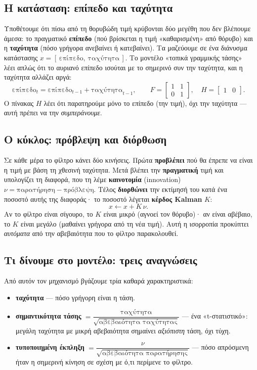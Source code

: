 \documentclass[11pt]{article}
\begin{document}
\subsection{Η κατάσταση: επίπεδο και ταχύτητα}
Υποθέτουμε ότι πίσω από τη θορυβώδη τιμή κρύβονται δύο μεγέθη που δεν βλέπουμε άμεσα: το πραγματικό
\textbf{επίπεδο} (πού βρίσκεται η τιμή «καθαρισμένη» από θόρυβο) και η \textbf{ταχύτητα} (πόσο γρήγορα
ανεβαίνει ή κατεβαίνει). Τα μαζεύουμε σε ένα διάνυσμα κατάστασης $x=[\,\text{επίπεδο},\ \text{ταχύτητα}\,]$.
Το μοντέλο «τοπικά γραμμικής τάσης» λέει απλώς ότι το αυριανό επίπεδο ισούται με το σημερινό συν την
ταχύτητα, και η ταχύτητα αλλάζει αργά:
\[
\text{επίπεδο}_{t} = \text{επίπεδο}_{t-1} + \text{ταχύτητα}_{t-1}, \qquad
F=\begin{bmatrix}1&1\\[1pt]0&1\end{bmatrix},\quad H=\begin{bmatrix}1&0\end{bmatrix}.
\]
Ο πίνακας $H$ λέει ότι παρατηρούμε μόνο το επίπεδο (την τιμή), όχι την ταχύτητα --- αυτή πρέπει να την
\emph{συμπεράνουμε}.

\subsection{Ο κύκλος: πρόβλεψη και διόρθωση}
Σε κάθε μέρα το φίλτρο κάνει δύο κινήσεις. Πρώτα \textbf{προβλέπει} πού θα έπρεπε να είναι η τιμή με βάση
τη χθεσινή ταχύτητα. Μετά βλέπει την \textbf{πραγματική} τιμή και υπολογίζει τη διαφορά, που τη λέμε
\textbf{καινοτομία} (innovation) $\nu = \text{παρατήρηση} - \text{πρόβλεψη}$. Τέλος \textbf{διορθώνει}
την εκτίμησή του κατά ένα ποσοστό αυτής της διαφοράς· το ποσοστό λέγεται \textbf{κέρδος Kalman} $K$:
\[
x \leftarrow x + K\,\nu.
\]
Αν το φίλτρο είναι σίγουρο, το $K$ είναι μικρό (αγνοεί τον θόρυβο)· αν είναι αβέβαιο, το $K$ είναι
μεγάλο (μαθαίνει γρήγορα από τη νέα τιμή). Αυτή η ισορροπία προκύπτει \emph{αυτόματα} από την
αβεβαιότητα που το φίλτρο παρακολουθεί.

\subsection{Τι δίνουμε στο μοντέλο: τρεις αναγνώσεις}
Από αυτόν τον μηχανισμό βγάζουμε τρία καθαρά χαρακτηριστικά:
\begin{itemize}[nosep,leftmargin=1.4em]
\item \textbf{ταχύτητα} --- πόσο γρήγορη είναι η τάση.
\item \textbf{σημαντικότητα τάσης} $=\dfrac{\text{ταχύτητα}}{\sqrt{\text{αβεβαιότητα ταχύτητας}}}$ --- ένα
«t-στατιστικό»: μεγάλη ταχύτητα με μικρή αβεβαιότητα σημαίνει \emph{αξιόπιστη} τάση, όχι τύχη.
\item \textbf{τυποποιημένη έκπληξη} $=\dfrac{\nu}{\sqrt{\text{αβεβαιότητα παρατήρησης}}}$ --- πόσο
απρόσμενη ήταν η σημερινή κίνηση σε σχέση με ό,τι περίμενε το φίλτρο.
\end{itemize}
\end{document}
